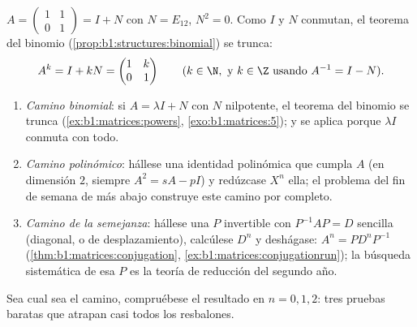 \begin{example}\label{ex:b1:matrices:powers}
$A = \begin{pmatrix} 1 & 1 \\ 0 & 1\end{pmatrix} = I + N$ con
$N = E_{12}$, $N^2 = 0$. Como $I$ y $N$ conmutan, el teorema del
binomio (\cref{prop:b1:structures:binomial}) se trunca:
\[
A^k = I + kN = \begin{pmatrix} 1 & k \\ 0 & 1 \end{pmatrix}
\qquad (k \in \N, \text{ y } k \in \Z \text{ usando } A^{-1} = I -
N).
\]
\end{example}

\begin{method}
\label{met:b1:matrices:powers}
\begin{enumerate}
  \item \emph{Camino binomial}: si $A = \lambda I + N$ con $N$
        nilpotente, el teorema del binomio se trunca
        (\cref{ex:b1:matrices:powers}, \cref{exo:b1:matrices:5});
        y se aplica porque $\lambda I$ conmuta con todo.
  \item \emph{Camino polinómico}: hállese una identidad
        polinómica que cumpla $A$ (en dimensión $2$, siempre
        $A^2 = sA - pI$) y redúzcase $X^n$  ella; el problema
        del fin de semana de más abajo construye este camino por
        completo.
  \item \emph{Camino de la semejanza}: hállese una $P$ invertible
        con $P^{-1}AP = D$ sencilla (diagonal, o de
        desplazamiento), calcúlese $D^n$ y deshágase:
        $A^n = P D^n P^{-1}$ (\cref{thm:b1:matrices:conjugation},
        \cref{ex:b1:matrices:conjugationrun}); la búsqueda
        sistemática de esa $P$ es la teoría de reducción del
        segundo año.
\end{enumerate}
Sea cual sea el camino, compruébese el resultado en $n = 0, 1, 2$:
tres pruebas baratas que atrapan casi todos los resbalones.
\end{method}

